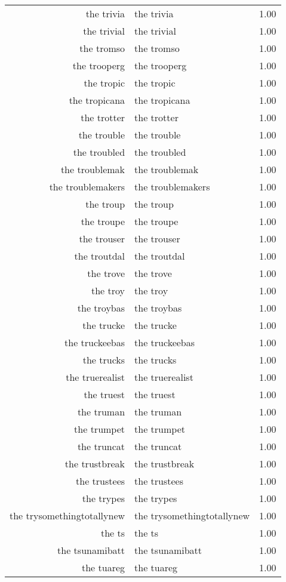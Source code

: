 \begin{table}[ht]
\begin{tabular}{rlr}
  the trivia & the trivia & 1.00 \\ 
  the trivial & the trivial & 1.00 \\ 
  the tromso & the tromso & 1.00 \\ 
  the trooperg & the trooperg & 1.00 \\ 
  the tropic & the tropic & 1.00 \\ 
  the tropicana & the tropicana & 1.00 \\ 
  the trotter & the trotter & 1.00 \\ 
  the trouble & the trouble & 1.00 \\ 
  the troubled & the troubled & 1.00 \\ 
  the troublemak & the troublemak & 1.00 \\ 
  the troublemakers & the troublemakers & 1.00 \\ 
  the troup & the troup & 1.00 \\ 
  the troupe & the troupe & 1.00 \\ 
  the trouser & the trouser & 1.00 \\ 
  the troutdal & the troutdal & 1.00 \\ 
  the trove & the trove & 1.00 \\ 
  the troy & the troy & 1.00 \\ 
  the troybas & the troybas & 1.00 \\ 
  the trucke & the trucke & 1.00 \\ 
  the truckeebas & the truckeebas & 1.00 \\ 
  the trucks & the trucks & 1.00 \\ 
  the truerealist & the truerealist & 1.00 \\ 
  the truest & the truest & 1.00 \\ 
  the truman & the truman & 1.00 \\ 
  the trumpet & the trumpet & 1.00 \\ 
  the truncat & the truncat & 1.00 \\ 
  the trustbreak & the trustbreak & 1.00 \\ 
  the trustees & the trustees & 1.00 \\ 
  the trypes & the trypes & 1.00 \\ 
  the trysomethingtotallynew & the trysomethingtotallynew & 1.00 \\ 
  the ts & the ts & 1.00 \\ 
  the tsunamibatt & the tsunamibatt & 1.00 \\ 
  the tuareg & the tuareg & 1.00 \\ 

\end{tabular}
\end{table}
